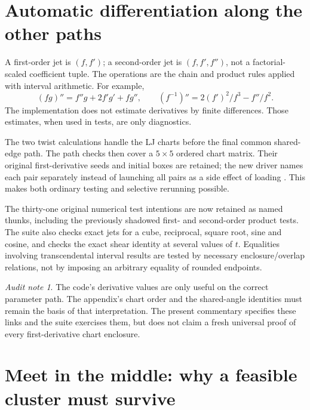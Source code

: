\documentclass[11pt,a4paper]{article}
\newcommand{\code}[1]{\texttt{\detokenize{#1}}}
\theoremstyle{remark}\newtheorem*{contract}{Implementation contract}\newtheorem*{auditnote}{Audit note}
\begin{document}
\section{Automatic differentiation along the other paths}

A first-order jet is $(f,f')$; a second-order jet is $(f,f',f'')$, not a
factorial-scaled coefficient tuple. The operations are the chain and product
rules applied with interval arithmetic. For example,
\[
(fg)''=f''g+2f'g'+fg'',\qquad
(f^{-1})''=2(f')^2/f^3-f''/f^2.
\]
The implementation does not estimate derivatives by finite differences.
Those estimates, when used in tests, are only diagnostics.



The two twist calculations handle the LJ charts before the final common
shared-edge path. The path checks then cover a $5\times5$ ordered chart
matrix. Their original first-derivative seeds and initial boxes are retained;
the new driver names each pair separately instead of launching all pairs as a
side effect of loading \code{autodiff.ml}. This makes both ordinary testing
and selective rerunning possible.

The thirty-one original numerical test intentions are now retained as named
thunks, including the previously shadowed first- and second-order product
tests. The suite also checks exact jets for a cube, reciprocal, square root,
sine and cosine, and checks the exact shear identity at several values of
$t$. Equalities involving transcendental interval results are tested by
necessary enclosure/overlap relations, not by imposing an arbitrary equality
of rounded endpoints.

\begin{auditnote}
The code's derivative values are only useful on the correct parameter path.
The appendix's chart order and the shared-angle identities must remain the
basis of that interpretation. The present commentary specifies these links
and the suite exercises them, but does not claim a fresh universal proof of
every first-derivative chart enclosure.
\end{auditnote}

\section{Meet in the middle: why a feasible cluster must survive}
\end{document}
